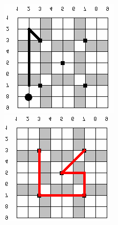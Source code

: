 \begin{anexos}
\begin{figure}[H]
	\begin{minipage}{0.4\linewidth}  %
		\centering
		\includegraphics[width=\linewidth]{passgo1.png} %
	\end{minipage}%
	\hfill
	\begin{minipage}{0.4\linewidth}  %
		\centering
		\includegraphics[width=\linewidth]{passgo2.png} %

\end{minipage}
\end{figure}
\end{anexos}
